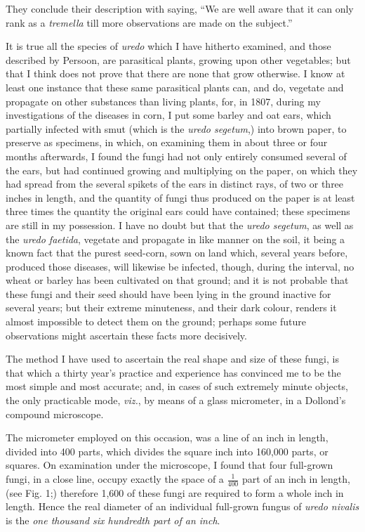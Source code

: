 \documentclass[a4paper, 12pt, oneside]{article}
\begin{document}
They conclude their description with saying, ``We are well aware that it can only rank as a \emph{tremella} till more observations are made on the subject.''

It is true all the species of \emph{uredo} which I have hitherto examined, and those described by Persoon, are parasitical plants, growing upon other vegetables; but that I think does not prove that there are none that grow otherwise. I know at least one instance that these same parasitical plants can, and do, vegetate and propagate on other substances than living plants, for, in 1807, during my investigations of the diseases in corn, I put some barley and oat ears, which partially infected with smut (which is the \emph{uredo segetum},) into brown paper, to preserve as specimens, in which, on examining them in about three or four months afterwards, I found the fungi had not only entirely consumed several of the ears, but had continued growing and multiplying on the paper, on which they had spread from the several spikets of the ears in distinct rays, of two or three inches in length, and the quantity of fungi thus produced on the paper is at least three times the quantity the original ears could have contained; these specimens are still in my possession. I have no doubt but that the \emph{uredo segetum}, as well as the \emph{uredo faetida}, vegetate and propagate in like manner on the soil, it being a known fact that the purest seed-corn, sown on land which, several years before, produced those diseases, will likewise be infected, though, during the interval, no wheat or barley has been cultivated on that ground; and it is not probable that these fungi and their seed should have been lying in the ground inactive for several years; but their extreme minuteness, and their dark colour, renders it almost impossible to detect them on the ground; perhaps some future observations might ascertain these facts more decisively.

The method I have used to ascertain the real shape and size of these fungi, is that which a thirty year's practice and experience has convinced me to be the most simple and most accurate; and, in cases of such extremely minute objects, the only practicable mode, \emph{viz.}, by means of a glass micrometer, in a Dollond's compound microscope.

The micrometer employed on this occasion, was a line of an inch in length, divided into 400 parts, which divides the square inch into 160,000 parts, or squares. On examination under the microscope, I found that four full-grown fungi, in a close line, occupy exactly the space of a $\frac{1}{400}$ part of an inch in length, (see Fig. 1;) therefore 1,600 of these fungi are required to form a whole inch in length. Hence the real diameter of an individual full-grown fungus of \emph{uredo nivalis} is the \emph{one thousand six hundredth part of an inch}.
\end{document}
